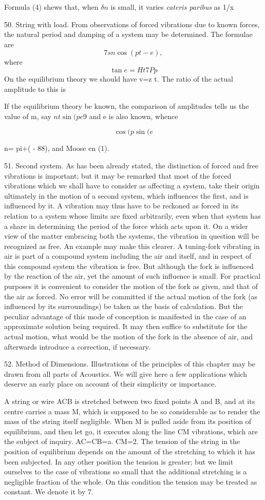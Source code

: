 Formula (4) shews that, when \(\delta n\) is small, it varies \textit{cateris
paribus} as 1/x

50. String with load.  From observations of forced vibrations due to known
forces, the natural period and damping of a system may be determined. The
formulae are
\[7sn  \cos(pt-e),\]
where
\[\tan e= Ht  7 Pp\]
On the equilibrium
theory we should have v=z t. The ratio of the actual amplitude to this is

If the equilibrium theory be known, the comparison of amplitudes tells us the
value of m, say \(nt  \sin(pe 9\) and e is also known, whence

\[\cos(p  \sin(e\]

n= pi+( - 88), and Moose en (1).

51. Second system. As has been already stated, the distinction of forced and
free vibrations is important; but it may be remarked that most of the forced
vibrations which we shall have to consider as affecting a system, take their
origin ultimately in the motion of a second system, which influences the first,
and is influenced by it. A vibration may thus have to be reckoned as forced in
its relation to a system whose limits are fixed arbitrarily, even when that
system has a share in determining the period of the force which acts upon it.
On a wider view of the matter embracing both the systems, the vibration in
question will be recognized as free. An example may make this clearer. A
tuning-fork vibrating in air is part of a compound system including the air and
itself, and in respect of this compound system the vibration is free. But
although the fork is influenced by the reaction of the air, yet the amount of
such influence is small. For practical purposes it is convenient to consider
the motion of the fork as given, and that of the air as forced. No error will
be committed if the actual motion of the fork (as influenced by its
surroundings) be taken as the basis of calculation. But the peculiar advantage
of this mode of conception is manifested in the case of an approximate solution
being required. It may then suffice to substitute for the actual motion, what
would be the motion of the fork in the absence of air, and afterwards introduce
a correction, if necessary.

52.  Method of Dimensions.
Illustrations of the principles of this chapter may be drawn from all parts
of Acoustics. We will give here a few applications which deserve an early place
on account of their simplicity or importance.

A string or wire ACB is stretched between two fixed points A and B, and at its
centre carries a mass M, which is supposed to be so considerable as to render
the mass of the string itself negligible. When M is pulled aside from its
position of equilibrium, and then let go, it executes along the line CM
vibrations, which are the subject of inquiry. AC=CB=a.  CM=2. The tension of
the string in the position of equilibrium depends on the amount of the
stretching to which it has been subjected. In any other position the tension is
greater; but we limit ourselves to the case of vibrations so small that the
additional stretching is a negligible fraction of the whole. On this condition
the tension may be treated as constant. We denote it by 7.

